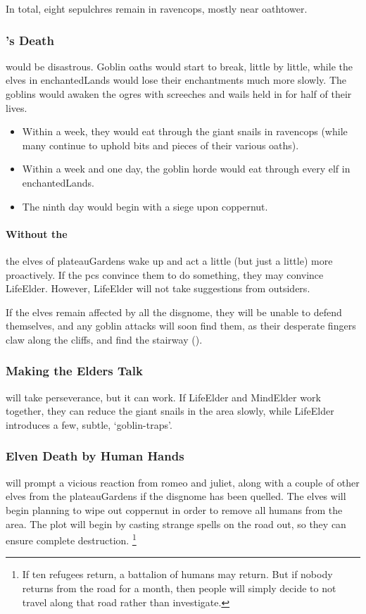\begin{multicols}{2}
In total, eight sepulchres remain in \gls{ravencops}, mostly near \gls{oathtower}.

\subsubsection{'s Death}
would be disastrous.
Goblin oaths would start to break, little by little, while the elves in \gls{enchantedLands} would lose their enchantments much more slowly.
The goblins would awaken the \glspl{ogre} with screeches and wails held in for half of their lives.

\begin{itemize}
  \item
  Within a week, they would eat through the giant snails in \gls{ravencops} (while many continue to uphold bits and pieces of their various oaths).
  \item
  Within a week and one day, the goblin horde would eat through every elf in \gls{enchantedLands}.
  \item
  The ninth day would begin with a siege upon \gls{coppernut}.
\end{itemize}

\paragraph{Without the }
the elves of \gls{plateauGardens} wake up and act a little (but just a little) more proactively.
If the \glspl{pc} convince them to do something, they may convince \gls{LifeElder}.
However, \gls{LifeElder} will not take suggestions from outsiders.

If the elves remain affected by all the \gls{disgnome}, they will be unable to defend themselves, and any goblin attacks will soon find them, as their desperate fingers claw along the cliffs, and find the stairway ().

\subsubsection{Making the Elders Talk}
will take perseverance, but it can work.
If \gls{LifeElder} and \gls{MindElder} work together, they can  reduce the giant snails in the area slowly, while \gls{LifeElder} introduces a few, subtle, `goblin-traps'.

\subsubsection{Elven Death by Human Hands}
will prompt a vicious reaction from \gls{romeo} and \gls{juliet}, along with a couple of other elves from the \gls{plateauGardens} if the \gls{disgnome} has been quelled.
The elves will begin planning to wipe out \gls{coppernut} in order to remove all humans from the area.
The plot will begin by casting strange spells on the road out, so they can ensure complete destruction.%
\footnote{If ten refugees return, a battalion of humans may return.
But if nobody returns from the road for a month, then people will simply decide to not travel along that road rather than investigate.}


\end{multicols}
